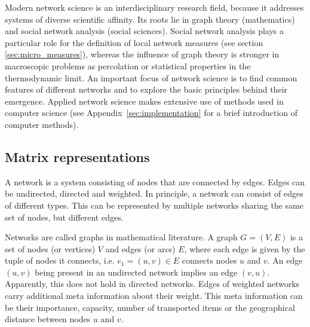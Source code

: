 Modern network science is an interdisciplinary research field, because it addresses systems of diverse scientific affinity.
Its roots lie in graph theory (mathematics) and social network analysis (social sciences).
Social network analysis plays a particular role for the definition of local network measures (see section \ref{sec:micro_measures}), whereas the influence of graph theory is stronger in macroscopic problems as percolation or statistical properties in the thermodynamic limit.
An important focus of network science is to find common features of different networks and to explore the basic principles behind their emergence.
Applied network science makes extensive use of methods used in computer science (see Appendix~\ref{sec:implementation} for a brief introduction of computer methods).

\subsection{Matrix representations}\label{sec:network_matrices}
A network is a system consisting of nodes that are connected by edges.
Edges can be undirected, directed and weighted.
In principle, a network can consist of edges of different types.
This can be represented by multiple networks sharing the same set of nodes, but different edges.

Networks are called graphs in mathematical literature.
A graph $G=(V,E)$ is a set of nodes (or vertices) $V$ and edges (or arcs) $E$, where each edge is given by the tuple of nodes it connects, i.e. $e_1 =(u,v) \in E$ connects nodes $u$ and $v$.
An edge $(u,v)$ being present in an undirected network implies an edge $(v,u)$.
Apparently, this does not hold in directed networks.
Edges of weighted networks carry additional meta information about their weight.
This meta information can be their importance, capacity, number of transported items or the geographical distance between nodes $u$ and $v$.

